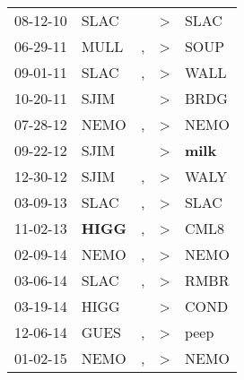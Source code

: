 \begin{supertabular}{p{0.07\textwidth}p{0.06\textwidth}p{0.02\textwidth}p{0.02\textwidth}p{0.06\textwidth}}
          08-12-10\textsuperscript{} &           SLAC\textsuperscript{} &                  &     \textgreater &           SLAC\textsuperscript{} \\
          06-29-11\textsuperscript{} &           MULL\textsuperscript{} &                , &     \textgreater &           SOUP\textsuperscript{} \\
          09-01-11\textsuperscript{} &           SLAC\textsuperscript{} &                , &     \textgreater &           WALL\textsuperscript{} \\
          10-20-11\textsuperscript{} &           SJIM\textsuperscript{} &                  &     \textgreater &           BRDG\textsuperscript{} \\
          07-28-12\textsuperscript{} &           NEMO\textsuperscript{} &                , &     \textgreater &           NEMO\textsuperscript{} \\
          09-22-12\textsuperscript{} &           SJIM\textsuperscript{} &                  &     \textgreater &  \textbf{milk\textsuperscript{}} \\
          12-30-12\textsuperscript{} &           SJIM\textsuperscript{} &                , &     \textgreater &           WALY\textsuperscript{} \\
          03-09-13\textsuperscript{} &           SLAC\textsuperscript{} &                , &     \textgreater &           SLAC\textsuperscript{} \\
          11-02-13\textsuperscript{} &  \textbf{HIGG\textsuperscript{}} &                , &     \textgreater &           CML8\textsuperscript{} \\
          02-09-14\textsuperscript{} &           NEMO\textsuperscript{} &                , &     \textgreater &           NEMO\textsuperscript{} \\
          03-06-14\textsuperscript{} &           SLAC\textsuperscript{} &                , &     \textgreater &           RMBR\textsuperscript{} \\
          03-19-14\textsuperscript{} &           HIGG\textsuperscript{} &                  &     \textgreater &           COND\textsuperscript{} \\
          12-06-14\textsuperscript{} &           GUES\textsuperscript{} &                , &     \textgreater &           peep\textsuperscript{} \\
          01-02-15\textsuperscript{} &           NEMO\textsuperscript{} &                , &     \textgreater &           NEMO\textsuperscript{} \\

\end{supertabular}

